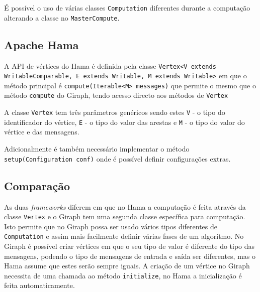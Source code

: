 É possível o uso de várias classes \texttt{Computation} diferentes durante a computação alterando a classe no \texttt{MasterCompute}.

\subsection*{Apache Hama}
A API de vértices do Hama é definida pela classe \texttt{Vertex<V extends WritableComparable, E extends Writable, M extends Writable>} em que o método principal é \texttt{compute(Iterable<M> messages)} que permite o mesmo que o método \texttt{compute} do Giraph, tendo acesso directo aos métodos de \texttt{Vertex}

A classe \texttt{Vertex} tem três parâmetros genéricos sendo estes \texttt{V} - o tipo do identificador do vértice, \texttt{E} - o tipo do valor das arestas e \texttt{M} - o tipo do valor do vértice e das mensagens.


Adicionalmente é também necessário implementar o método \texttt{setup(Configuration conf)} onde é possível definir configurações extras.
\subsection*{Comparação}


As duas \textit{frameworks} diferem em que no Hama a computação é feita através da classe \texttt{Vertex} e o Giraph tem uma segunda classe específica para computação. Isto permite que no Giraph possa ser usado vários tipos diferentes de \texttt{Computation} e assim mais facilmente definir várias fases de um algorítmo.
No Giraph é possível criar vértices em que o seu tipo de valor é diferente do tipo das mensagens, podendo o tipo de mensagens de entrada e saída ser diferentes, mas o Hama assume que estes serão sempre iguais. A criação de um vértice no Giraph necessita de uma chamada ao método \texttt{initialize}, no Hama a inicialização é feita automaticamente.
